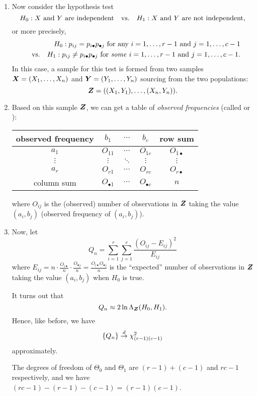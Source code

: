 \begin{enumerate}
\item Now consider the hypothesis test
\[
H_0:\text{\(X\) and \(Y\) are independent}\qqtext{vs.}
H_1:\text{\(X\) and \(Y\) are not independent},
\]
or more precisely,
\begin{align*}
H_0:\text{\(p_{ij}=p_{i\bullet}p_{\bullet j}\) for any \(i=1,\dotsc,r-1\) and \(j=1,\dotsc,c-1\)}\\
\quad\qq*{vs.} H_1:\text{\(p_{ij}\ne p_{i\bullet}p_{\bullet j}\) for \emph{some} \(i=1,\dotsc,r-1\) and \(j=1,\dotsc,c-1\)}.
\end{align*}
In this case, a sample for this test is formed from two samples
\(\vb*{X}=(X_1,\dotsc,X_n)\) and \(\vb*{Y}=(Y_1,\dotsc,Y_n)\) sourcing from
the two populations:
\[
\vb*{Z}=\qty((X_1,Y_1),\dotsc,(X_n,Y_n)).
\]
\item Based on this sample \(\vb*{Z}\), we can get a table of \emph{observed
frequencies} (called  or ):
\begin{center}
\begin{tabular}{c|ccc|c}
\toprule
observed frequency&\(b_1\)&\(\cdots\)&\(b_c\)&row sum\\
\midrule
\(a_1\)&\(O_{11}\)&\(\cdots\)&\(O_{1c}\)&\(O_{1\bullet}\)\\
\(\vdots\)&\(\vdots\)&\(\ddots\)&\(\vdots\)&\(\vdots\)\\
\(a_r\)&\(O_{r1}\)&\(\cdots\)&\(O_{rc}\)&\(O_{r\bullet}\)\\
\midrule
column sum&\(O_{\bullet 1}\)&\(\cdots\)&\(O_{\bullet c}\)&\(n\)\\
\bottomrule
\end{tabular}
\end{center}
where \(O_{ij}\) is the (observed) number of observations in \(\vb*{Z}\)
taking the value \((a_i,b_j)\) (observed frequency of \((a_i,b_j)\)).

\item Now, let
\[
Q_n=\sum_{i=1}^{r}\sum_{j=1}^{c}\frac{(O_{ij}-E_{ij})^2}{E_{ij}}
\]
where \(\displaystyle E_{ij}=n\cdot\frac{O_{i\bullet}}{n}\cdot\frac{O_{\bullet
j}}{n}=\frac{O_{i\bullet}O_{\bullet j}}{n}\) is the ``expected'' number of
observations in \(\vb*{Z}\) taking the value \((a_i,b_j)\) when \(H_0\) is
true.

It turns out that
\[
Q_n\approx 2\ln\Lambda_{\vb*{Z}}(H_0,H_1).
\]
Hence, like before, we have
\[
\{Q_n\}\overset{d}{\to} \chi^2_{(r-1)(c-1)}
\]
approximately.

\begin{note}
The degrees of freedom of \(\Theta_0\) and \(\Theta_1\) are \((r-1)+(c-1)\) and
\(rc-1\) respectively, and we have \((rc-1)-(r-1)-(c-1)=(r-1)(c-1)\).


\end{note}
\end{enumerate}
